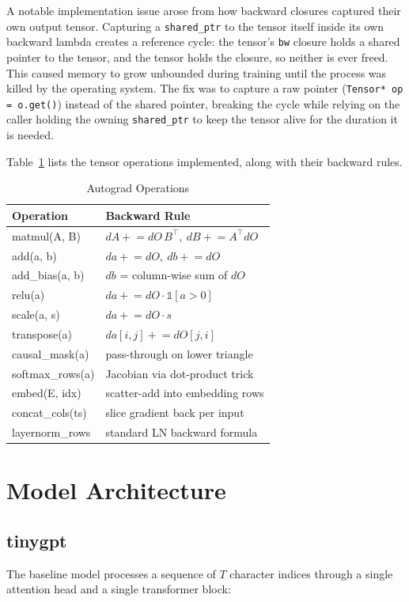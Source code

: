 \documentclass[conference]{IEEEtran}
\begin{document}
A notable implementation issue arose from how backward closures captured their own output tensor. Capturing a \texttt{shared\_ptr} to the tensor itself inside its own backward lambda creates a reference cycle: the tensor's \texttt{bw} closure holds a shared pointer to the tensor, and the tensor holds the closure, so neither is ever freed. This caused memory to grow unbounded during training until the process was killed by the operating system. The fix was to capture a raw pointer (\texttt{Tensor* op = o.get()}) instead of the shared pointer, breaking the cycle while relying on the caller holding the owning \texttt{shared\_ptr} to keep the tensor alive for the duration it is needed.

Table~\ref{tab:ops} lists the tensor operations implemented, along with their backward rules.

\begin{table}[h]
\centering
\caption{Autograd Operations}
\label{tab:ops}
\begin{tabular}{ll}
\toprule
Operation & Backward Rule \\
\midrule
matmul(A, B) & $dA \mathrel{+}= dO \, B^\top,\ dB \mathrel{+}= A^\top dO$ \\
add(a, b) & $da \mathrel{+}= dO,\ db \mathrel{+}= dO$ \\
add\_bias(a, b) & $db$ = column-wise sum of $dO$ \\
relu(a) & $da \mathrel{+}= dO \cdot \mathbb{1}[a>0]$ \\
scale(a, s) & $da \mathrel{+}= dO \cdot s$ \\
transpose(a) & $da[i,j] \mathrel{+}= dO[j,i]$ \\
causal\_mask(a) & pass-through on lower triangle \\
softmax\_rows(a) & Jacobian via dot-product trick \\
embed(E, idx) & scatter-add into embedding rows \\
concat\_cols(ts) & slice gradient back per input \\
layernorm\_rows & standard LN backward formula \\
\bottomrule
\end{tabular}
\end{table}

\section{Model Architecture}

\subsection{tinygpt}
The baseline model processes a sequence of $T$ character indices through a single attention head and a single transformer block:
\end{document}
